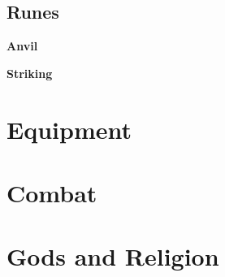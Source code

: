 \documentclass[12pt]{article}
\newcommand{\subsubsubsection}[1]{%
  \vspace{1em} %
  \noindent\textbf{\small #1}\par
  \vspace{0.5em} %
}
\begin{document}
\subsection{Runes}
\subsubsubsection{Anvil}
\subsubsubsection{Striking}
\section{Equipment}
\section{Combat}
\section{Gods and Religion}











\newpage
\printindex
\end{document}

